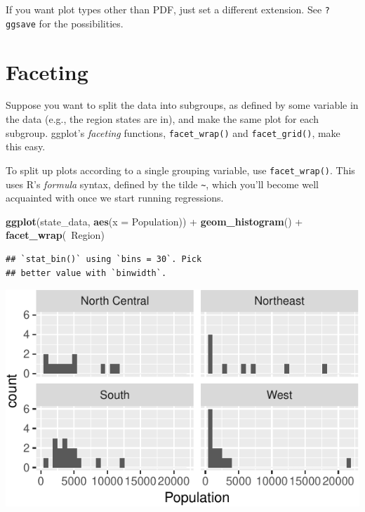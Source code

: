 \documentclass[12pt,oneside,openany]{tufte-book}
\newenvironment{Shaded}{}{}
\newcommand{\KeywordTok}[1]{\textcolor[rgb]{0.00,0.44,0.13}{\textbf{{#1}}}}
\newcommand{\DataTypeTok}[1]{\textcolor[rgb]{0.56,0.13,0.00}{{#1}}}
\newcommand{\StringTok}[1]{\textcolor[rgb]{0.25,0.44,0.63}{{#1}}}
\newcommand{\NormalTok}[1]{{#1}}
\begin{document}
If you want plot types other than PDF, just set a different extension.
See \texttt{?ggsave} for the possibilities.

\section{Faceting}\label{faceting}

Suppose you want to split the data into subgroups, as defined by some
variable in the data (e.g., the region states are in), and make the same
plot for each subgroup. ggplot's \emph{faceting} functions,
\texttt{facet\_wrap()} and \texttt{facet\_grid()}, make this easy.

To split up plots according to a single grouping variable, use
\texttt{facet\_wrap()}. This uses R's \emph{formula} syntax, defined by
the tilde \texttt{\textasciitilde{}}, which you'll become well
acquainted with once we start running regressions.

\begin{Shaded}
\begin{Highlighting}[]
\KeywordTok{ggplot}\NormalTok{(state_data, }\KeywordTok{aes}\NormalTok{(}\DataTypeTok{x =} \NormalTok{Population)) +}\StringTok{ }\KeywordTok{geom_histogram}\NormalTok{() +}\StringTok{ }
\StringTok{    }\KeywordTok{facet_wrap}\NormalTok{(~Region)}
\end{Highlighting}
\end{Shaded}

\begin{verbatim}
## `stat_bin()` using `bins = 30`. Pick
## better value with `binwidth`.
\end{verbatim}

\includegraphics{pdaps_files/figure-latex/facet-wrap-1}
\end{document}
